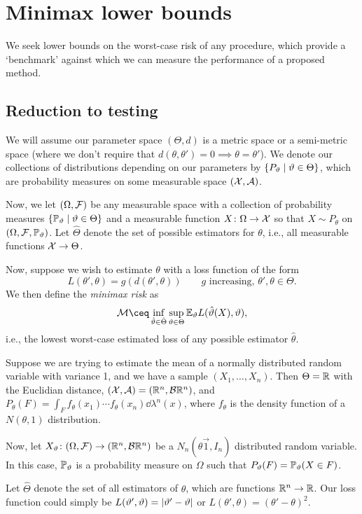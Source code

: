 \section{Minimax lower bounds}
We seek lower bounds on the worst-case risk of any procedure, which provide a `benchmark'  against which we can measure the performance of a proposed method. 

\subsection{Reduction to testing}
We will assume our parameter space $(\Theta, d)$ is a metric space or a semi-metric space (where we don't require that $d(\theta, \theta') = 0 \implies \theta = \theta'$). We denote our collections of distributions depending on our parameters by $\qty{P_\vartheta\mid \vartheta\in \Theta}$, which are probability measures on some measurable space $(\mathcal X, \mathcal A)$. 

Now, we let $(\Omega, \mathcal F)$ be any measurable space with a collection of probability measures $\qty{\mathbb P_\vartheta\mid \vartheta\in \Theta}$ and a measurable function $X \colon \Omega \to \mathcal X$ so that $X \sim P_\theta$ on $(\Omega, \mathcal F, \mathbb P_\vartheta)$. Let $\hat\Theta$ denote the set of possible estimators for $\theta$, i.e., all measurable functions $\mathcal X \to\Theta$. 

Now, suppose we wish to estimate $\theta$ with a loss function of the form
\[ 
L(\theta', \theta) = g(d(\theta', \theta)) \qquad\text{$g$ increasing, $\theta', \theta \in \Theta$}. 
\]
We then define the \emph{minimax risk} as 
\[
\Cal M \ceq \inf_{\hat\theta \in \hat\Theta} \sup_{\theta \in \Theta} \EE_\theta L(\hat\theta(X), \theta),
\]
i.e., the lowest worst-case estimated loss of any possible estimator $\hat\theta$. 


\begin{example}
Suppose we are trying to estimate the mean of a normally distributed random variable with variance 1, and we have a sample $(X_1, \dotsc, X_n)$. Then $\Theta = \mathbb R$ with the Euclidian distance, $(\mathcal X, \mathcal A) = (\mathbb R^n, \mathcal B\mathbb R^n)$, and $P_\theta(F) = \int_F f_\theta(x_1)\dotsb f_\theta(x_n) \dd{\lambda^n(x)}$, where $f_\theta$ is the density function of a $N(\theta, 1)$ distribution. 

Now, let $X_\vartheta \colon (\Omega, \mathcal F) \to (\mathbb R^n, \mathcal B\mathbb R^n)$ be a $N_n(\theta \vec 1, I_n)$ distributed random variable. In this case, $\mathbb P_\vartheta$ is a probability measure on $\Omega$ such that $P_\vartheta(F) = \mathbb P_\vartheta(X \in F)$. 

Let $\hat\Theta$ denote the set of all estimators of $\theta$, which are functions $\mathbb R^n \to \mathbb R$. Our loss function could simply be $L(\vartheta', \vartheta) = \abs{\vartheta' - \vartheta}$ or $L(\theta', \theta) = (\theta' - \theta)^2$. 
\end{example}

